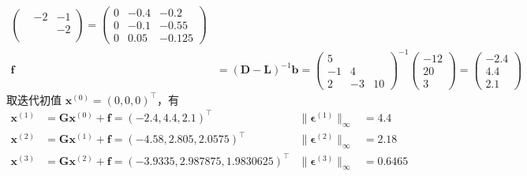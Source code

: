\documentclass{sjtuarticle}
\begin{document}
\begin{itemize}
\begin{solution}
\begin{itemize}
\begin{description}
\begin{align*}
\begin{pmatrix}
                & -2 & -1 \\ & & -2 \\ &
            \end{pmatrix}
            =\begin{pmatrix}
                0 & -0.4 & -0.2 \\
                0 & -0.1 & -0.55 \\
                0 & 0.05 & -0.125
            \end{pmatrix}\\
            \bm{f}&=(\bm{D}-\bm{L})^{-1}\bm{b}=\begin{pmatrix}
                5 &  &  \\
                -1 & 4 &  \\
                2 & -3 & 10
            \end{pmatrix}^{-1}\begin{pmatrix}
                -12 \\ 20 \\ 3
            \end{pmatrix}=\begin{pmatrix}
                -2.4 \\ 4.4 \\ 2.1
            \end{pmatrix}
        \end{align*}
        取迭代初值 $\bm{x}^{(0)}=(0,0,0)^\top$，有
        \begin{align*}
            \bm{x}^{(1)}&=\bm{G}\bm{x}^{(0)}+\bm{f}=\left(-2.4, 4.4, 2.1\right)^\top & \lVert\bm{\epsilon}^{(1)}\rVert_{\infty}&=4.4 \\
\bm{x}^{(2)}&=\bm{G}\bm{x}^{(1)}+\bm{f}=\left(-4.58, 2.805, 2.0575\right)^\top & \lVert\bm{\epsilon}^{(2)}\rVert_{\infty}&=2.18 \\
\bm{x}^{(3)}&=\bm{G}\bm{x}^{(2)}+\bm{f}=\left(-3.9335, 2.987875, 1.9830625\right)^\top & \lVert\bm{\epsilon}^{(3)}\rVert_{\infty}&=0.6465 \\

\end{align*}
\end{description}
\end{itemize}
\end{solution}
\end{itemize}
\end{document}
